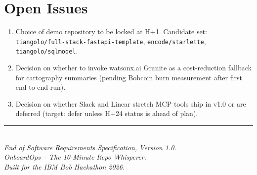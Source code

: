 \documentclass[11pt,letterpaper]{article}
\begin{document}
\section{Open Issues}

\begin{enumerate}
  \item Choice of demo repository to be locked at H+1. Candidate set: \texttt{tiangolo/full-stack-fastapi-template}, \texttt{encode/starlette}, \texttt{tiangolo/sqlmodel}.
  \item Decision on whether to invoke watsonx.ai Granite as a cost-reduction fallback for cartography summaries (pending Bobcoin burn measurement after first end-to-end run).
  \item Decision on whether Slack and Linear stretch MCP tools ship in v1.0 or are deferred (target: defer unless H+24 status is ahead of plan).
\end{enumerate}

\vfill

\begin{center}
\rule{0.6\textwidth}{0.6pt}\\
\vspace{0.3em}
{\small\itshape\color{ibmgray} End of Software Requirements Specification, Version 1.0.\\}
{\small\itshape\color{ibmgray} OnboardOps -- The 10-Minute Repo Whisperer.\\}
{\small\itshape\color{ibmgray} Built for the IBM Bob Hackathon 2026.}
\end{center}
\end{document}
